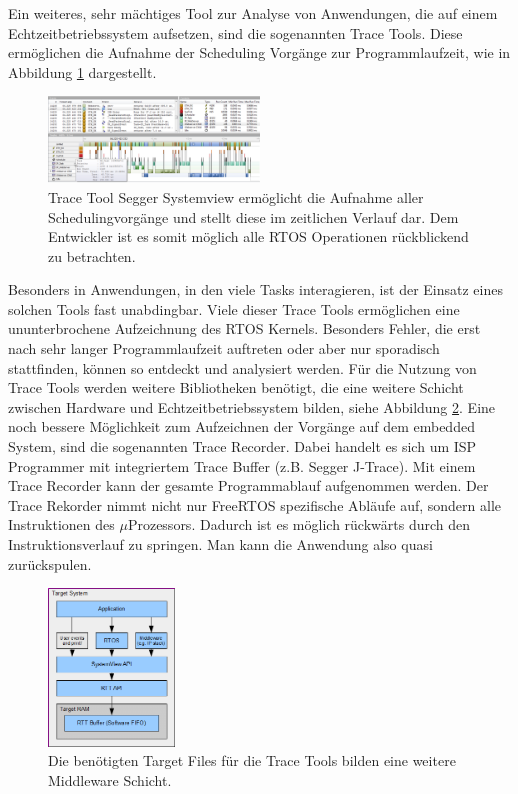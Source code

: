 Ein weiteres, sehr mächtiges Tool zur Analyse von Anwendungen, die auf einem Echtzeitbetriebssystem aufsetzen, sind die sogenannten Trace Tools. Diese ermöglichen die Aufnahme der Scheduling Vorgänge zur Programmlaufzeit, wie in Abbildung \ref {fig:Systemview} dargestellt. 
\begin{figure}[hbt]
	\centering
		\includegraphics[width=0.5\textwidth]{Pictures/Segger/systemview.png}
	\caption{Trace Tool Segger Systemview ermöglicht die Aufnahme aller Schedulingvorgänge und stellt diese im zeitlichen Verlauf dar. Dem Entwickler ist es somit möglich alle RTOS Operationen rückblickend zu betrachten.}
	\label{fig:Systemview}
\end{figure}
Besonders in Anwendungen, in den viele Tasks interagieren, ist der Einsatz eines solchen Tools fast unabdingbar. Viele dieser Trace Tools ermöglichen eine ununterbrochene Aufzeichnung des RTOS Kernels. Besonders Fehler, die erst nach sehr langer Programmlaufzeit auftreten oder aber nur sporadisch stattfinden, können so entdeckt und analysiert werden. Für die Nutzung von Trace Tools werden weitere Bibliotheken benötigt, die eine weitere Schicht zwischen Hardware und Echtzeitbetriebssystem bilden, siehe Abbildung \ref{fig:SystemviewTarget}. Eine noch bessere Möglichkeit zum Aufzeichnen der Vorgänge auf dem embedded System, sind die sogenannten Trace Recorder. Dabei handelt es sich um ISP Programmer mit integriertem Trace Buffer (z.B. Segger J-Trace). Mit einem Trace Recorder kann der gesamte Programmablauf aufgenommen werden. Der Trace Rekorder nimmt nicht nur FreeRTOS spezifische Abläufe auf, sondern alle Instruktionen des $\mu$Prozessors. Dadurch ist es möglich rückwärts durch den Instruktionsverlauf zu springen. Man kann die Anwendung also quasi zurückspulen.
\begin{figure}[hbt]
	\centering
		\includegraphics[width=0.3\textwidth]{Pictures/Segger/SystemViewTarget.png}
	\caption{Die benötigten Target Files für die Trace Tools bilden eine weitere Middleware Schicht.}
	\label{fig:SystemviewTarget}
\end{figure}
